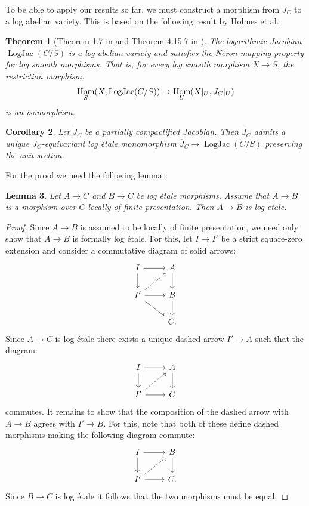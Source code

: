 \documentclass[11pt]{amsart}
\newtheorem{theorem}{Theorem}[section]
\newtheorem{lemma}[theorem]{Lemma}
\newtheorem{corollary}[theorem]{Corollary}
\theoremstyle{definition}
\theoremstyle{remark}
\DeclareMathOperator{\LogJac}{LogJac}
\DeclareMathOperator{\Hom}{\textup{Hom}}
\begin{document}
To be able to apply our results so far, we must construct a morphism from $\overline{J}_C$
to a log abelian variety. This is based on the following result by Holmes et al.:

\begin{theorem}[Theorem 1.7 in \cite{ModelsOfJacobHolmes2020} and Theorem 4.15.7 in \cite{TheLogarithmicMolcho2022}]
	\label{thm:neron_mapping}
	The logarithmic Jacobian $\LogJac(C/S)$ is a log abelian variety and
	satisfies the Néron mapping property for log smooth morphisms. That is, for
	every log smooth morphism $X\to S$, the restriction morphism:
	$$\Hom_S(X,\LogJac(C/S))\to \Hom_U(X|_U,J_C|_U)$$
	is an isomorphism.
\end{theorem}

\begin{corollary}
	\label{cor:let_over_logjac}
	Let $\overline{J}_C$ be a partially compactified Jacobian. Then $\overline{J}_C$
	admits a unique $J_C$-equivariant log étale monomorphism $\overline{J}_C\to \LogJac(C/S)$
	preserving the unit section.
\end{corollary}

For the proof we need the following lemma:

\begin{lemma}
	\label{lem:let_when_both}
	Let $A\to C$ and $B\to C$ be log étale morphisms.
	Assume that $A\to B$ is a morphism over $C$ locally of finite presentation. Then $A\to B$ is log étale.
\end{lemma}

\begin{proof}
	Since $A\to B$ is assumed to be locally of finite presentation, we need only show that
	$A\to B$ is formally log étale. For this,
	let $I\to I'$ be a strict square-zero extension and consider
	a commutative diagram of solid arrows:
	$$\begin{tikzcd}
		I\arrow[d]\arrow[r]&A\arrow[d]\\
		I'\arrow[r]\arrow[rd]\arrow[ru,dashed]&B\arrow[d]\\
									&C.
	\end{tikzcd}$$
	Since $A\to C$ is log étale there exists
	a unique dashed arrow $I'\to A$
	such that the diagram:
	$$\begin{tikzcd}
		I\arrow[d]\arrow[r]&A\arrow[d]\\
		I'\arrow[r]\arrow[ru,dashed]&C
	\end{tikzcd}$$
	commutes. It remains to show that the composition of the
	dashed arrow with $A\to B$
	agrees with $I'\to B$. For this, note that both
	of these define dashed morphisms making the following diagram
	commute:
	$$\begin{tikzcd}
		I\arrow[r]\arrow[d]&B\arrow[d]\\
		I'\arrow[r]\arrow[ru,dashed]&C.
	\end{tikzcd}$$
	Since $B\to C$ is log étale it follows that
	the two morphisms must be equal.
\end{proof}
\end{document}
